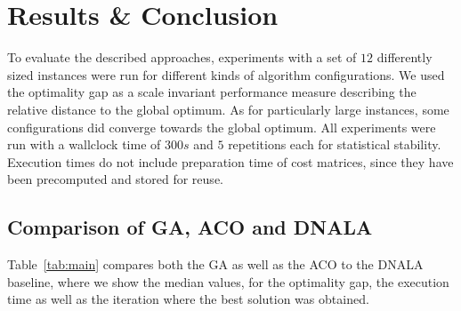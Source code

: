 \documentclass[12pt]{article}
\begin{document}
\section{Results \& Conclusion}
To evaluate the described approaches, experiments with a set of $12$ differently sized instances were run for different kinds of algorithm configurations. 
We used the optimality gap as a scale invariant performance measure describing the relative distance to the global optimum. 
As for particularly large instances, some configurations did converge towards the global optimum.
All experiments were run with a wallclock time of $300 s$ and $5$ repetitions each for statistical stability. Execution times do not include preparation time of cost matrices, since they have been precomputed and stored for reuse.

\subsection{Comparison of GA, ACO and DNALA}

Table~\ref{tab:main} compares both the GA as well as the ACO to the DNALA baseline, where we show the median values, for the optimality gap, the execution time as well as the iteration where the best solution was obtained. 
\end{document}

